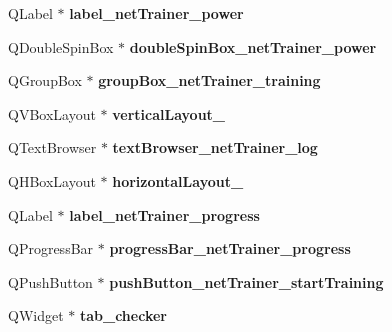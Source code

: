 \begin{DoxyCompactItemize}
Q\+Label $\ast$ {\bfseries label\+\_\+net\+Trainer\+\_\+power}
\item 
\mbox{\label{class_ui___main_window_ab4e021de08380baebb1696d45195b884}} 
Q\+Double\+Spin\+Box $\ast$ {\bfseries double\+Spin\+Box\+\_\+net\+Trainer\+\_\+power}
\item 
\mbox{\label{class_ui___main_window_a89e0edc45e337c55b8dd592bff4b8e05}} 
Q\+Group\+Box $\ast$ {\bfseries group\+Box\+\_\+net\+Trainer\+\_\+training}
\item 
\mbox{\label{class_ui___main_window_a536714c33f60a411653b417227c0a670}} 
Q\+V\+Box\+Layout $\ast$ {\bfseries vertical\+Layout\+\_}
\item 
\mbox{\label{class_ui___main_window_a9d9a04849f95ef22ea203798d8b46675}} 
Q\+Text\+Browser $\ast$ {\bfseries text\+Browser\+\_\+net\+Trainer\+\_\+log}
\item 
\mbox{\label{class_ui___main_window_ad81454913b05646674b1a41c595b8510}} 
Q\+H\+Box\+Layout $\ast$ {\bfseries horizontal\+Layout\+\_}
\item 
\mbox{\label{class_ui___main_window_a2e3bfe83396cd8c5fd49491cbe4a9134}} 
Q\+Label $\ast$ {\bfseries label\+\_\+net\+Trainer\+\_\+progress}
\item 
\mbox{\label{class_ui___main_window_a59b1f6a77094d6363fbbc18df5fb6cbd}} 
Q\+Progress\+Bar $\ast$ {\bfseries progress\+Bar\+\_\+net\+Trainer\+\_\+progress}
\item 
\mbox{\label{class_ui___main_window_af009b50e76b6304cb606969e1abed0eb}} 
Q\+Push\+Button $\ast$ {\bfseries push\+Button\+\_\+net\+Trainer\+\_\+start\+Training}
\item 
\mbox{\label{class_ui___main_window_aadcc36da27d66e2a5765156e07efbf78}} 
Q\+Widget $\ast$ {\bfseries tab\+\_\+checker}
\item 
\mbox{\label{class_ui___main_window_a9084c726c02070d34f7944ef752115e9}} 

\end{DoxyCompactItemize}
